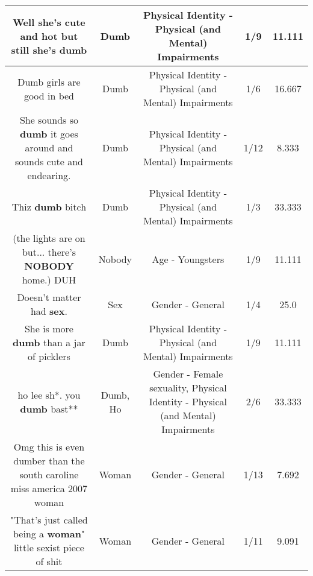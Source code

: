 \documentclass[11pt]{article}
\newlength\mylength
\begin{document}
\begin{center}
\begin{longtable}{|C{.65\mylength}|C{.30\mylength}|C{.12\mylength}|C{.12\mylength}|C{.12\mylength}|}
  \small Well she's cute and hot but still she's dumb\normalsize   & Dumb & Physical Identity - Physical (and Mental) Impairments & 1/9 & 11.111 \\  \hline
  \small Dumb girls are good in bed\normalsize   & Dumb & Physical Identity - Physical (and Mental) Impairments & 1/6 & 16.667 \\  \hline
  \small She sounds so \textbf{dumb} it goes around and sounds cute and endearing.\normalsize   & Dumb & Physical Identity - Physical (and Mental) Impairments & 1/12 & 8.333 \\  \hline
  \small Thiz \textbf{dumb} bitch\normalsize   & Dumb & Physical Identity - Physical (and Mental) Impairments & 1/3 & 33.333 \\  \hline
  \small (the lights are on but... there's \textbf{NOBODY} home.) DUH\normalsize   & Nobody & Age - Youngsters & 1/9 & 11.111 \\  \hline
  \small Doesn't matter had \textbf{sex}.\normalsize   & Sex & Gender - General & 1/4 & 25.0 \\  \hline
  \small She is more \textbf{dumb} than a jar of picklers\normalsize   & Dumb & Physical Identity - Physical (and Mental) Impairments & 1/9 & 11.111 \\  \hline
  \small ho lee sh*. you \textbf{dumb} bast**\normalsize   & Dumb, Ho & Gender - Female sexuality, Physical Identity - Physical (and Mental) Impairments & 2/6 & 33.333 \\  \hline
  \small Omg this is even dumber than the south caroline miss america 2007 woman\normalsize   & Woman & Gender - General & 1/13 & 7.692 \\  \hline
  \small "That's just called being a \textbf{woman}" little sexist piece of shit\normalsize   & Woman & Gender - General & 1/11 & 9.091 \\  \hline

\end{longtable}
\end{center}
\end{document}
